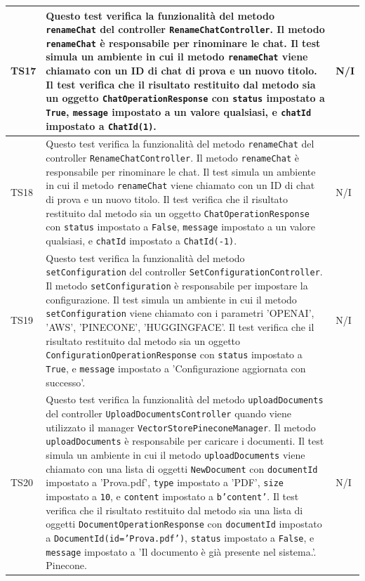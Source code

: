 \documentclass[10pt, a4paper]{article}
\begin{document}
\begin{xltabular}{\textwidth}{p{0.12\textwidth}|X|p{0.12\textwidth}}
    \hline
    TS17 & Questo test verifica la funzionalità del metodo \texttt{renameChat} del controller \texttt{RenameChatController}. Il metodo \texttt{renameChat} è responsabile per rinominare le chat. Il test simula un ambiente in cui il metodo \texttt{renameChat} viene chiamato con un ID di chat di prova e un nuovo titolo. Il test verifica che il risultato restituito dal metodo sia un oggetto \texttt{ChatOperationResponse} con \texttt{status} impostato a \texttt{True}, \texttt{message} impostato a un valore qualsiasi, e \texttt{chatId} impostato a \texttt{ChatId(1)}. & N/I \\
    \hline
    TS18 & Questo test verifica la funzionalità del metodo \texttt{renameChat} del controller \texttt{RenameChatController}. Il metodo \texttt{renameChat} è responsabile per rinominare le chat. Il test simula un ambiente in cui il metodo \texttt{renameChat} viene chiamato con un ID di chat di prova e un nuovo titolo. Il test verifica che il risultato restituito dal metodo sia un oggetto \texttt{ChatOperationResponse} con \texttt{status} impostato a \texttt{False}, \texttt{message} impostato a un valore qualsiasi, e \texttt{chatId} impostato a \texttt{ChatId(-1)}. & N/I \\
    \hline
    TS19 & Questo test verifica la funzionalità del metodo \texttt{setConfiguration} del controller \texttt{SetConfigurationController}. Il metodo \texttt{setConfiguration} è responsabile per impostare la configurazione. Il test simula un ambiente in cui il metodo \texttt{setConfiguration} viene chiamato con i parametri 'OPENAI', 'AWS', 'PINECONE', 'HUGGINGFACE'. Il test verifica che il risultato restituito dal metodo sia un oggetto \texttt{ConfigurationOperationResponse} con \texttt{status} impostato a \texttt{True}, e \texttt{message} impostato a 'Configurazione aggiornata con successo'. & N/I \\
    \hline
    TS20 & Questo test verifica la funzionalità del metodo \texttt{uploadDocuments} del controller \texttt{UploadDocumentsController} quando viene utilizzato il manager \texttt{VectorStorePineconeManager}. Il metodo \texttt{uploadDocuments} è responsabile per caricare i documenti. Il test simula un ambiente in cui il metodo \texttt{uploadDocuments} viene chiamato con una lista di oggetti \texttt{NewDocument} con \texttt{documentId} impostato a 'Prova.pdf', \texttt{type} impostato a 'PDF', \texttt{size} impostato a \texttt{10}, e \texttt{content} impostato a \texttt{b'content'}. Il test verifica che il risultato restituito dal metodo sia una lista di oggetti \texttt{DocumentOperationResponse} con \texttt{documentId} impostato a \texttt{DocumentId(id='Prova.pdf')}, \texttt{status} impostato a \texttt{False}, e \texttt{message} impostato a 'Il documento è già presente nel sistema.'. Pinecone. & N/I \\

\end{xltabular}
\end{document}

